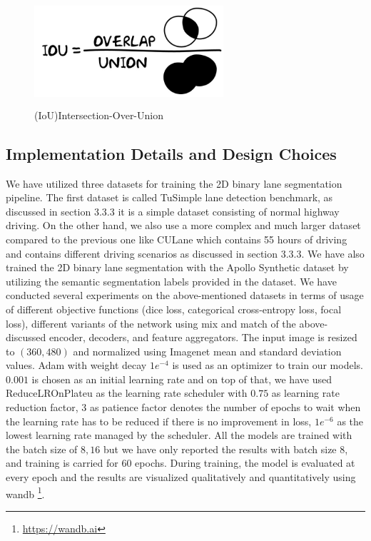          \begin{figure}[h]
    \centering
    \includegraphics[width=7cm, height=4cm]{images/IOU.png}
    \caption{(IoU)Intersection-Over-Union \cite{IOU}}
    \end{figure}
        
        \subsection{Implementation Details and Design Choices}
        We have utilized three datasets for training the 2D binary lane segmentation pipeline. The first dataset is called TuSimple lane detection benchmark\cite{Tusimple}, as discussed in section 3.3.3 it is a simple dataset consisting of normal highway driving. On the other hand, we also use a more complex and much larger dataset compared to the previous one like CULane\cite{pan2018SCNN} which contains 55 hours of driving and contains different driving scenarios as discussed in section 3.3.3. We have also trained the 2D binary lane segmentation with the Apollo Synthetic dataset\cite{guo2020gen} by utilizing the semantic segmentation labels provided in the dataset. We have conducted several experiments on the above-mentioned datasets in terms of usage of different objective functions (dice loss, categorical cross-entropy loss, focal loss), different variants of the network using mix and match of the above-discussed encoder, decoders, and feature aggregators. The input image is resized to $(360,480)$ and normalized using Imagenet\cite{deng2009imagenet} mean and standard deviation values. Adam\cite{Kingma2015AdamAM} with weight decay $1e^{-4}$ is used as an optimizer to train our models. $0.001$ is chosen as an initial learning rate and on top of that, we have used ReduceLROnPlateu  as the learning rate scheduler with $0.75$ as learning rate reduction factor, $3$ as patience factor denotes the number of epochs to wait when the learning rate has to be reduced if there is no improvement in loss, $1e^{-6}$ as the lowest learning rate managed by the scheduler. All the models are trained with the batch size of $8, 16$ but we have only reported the results with batch size $8$, and training is carried for $60$ epochs. During training, the model is evaluated at every epoch and the results are visualized qualitatively and quantitatively using wandb \footnote{\url{https://wandb.ai}}.
        
